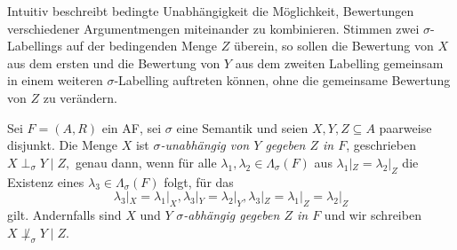 Intuitiv beschreibt bedingte Unabhängigkeit die Möglichkeit, 
Bewertungen verschiedener Argumentmengen miteinander zu kombinieren.
Stimmen zwei \(\sigma\)-Labellings auf der bedingenden Menge \(Z\) überein, 
so sollen die Bewertung von \(X\) aus dem ersten und die Bewertung von 
\(Y\) aus dem zweiten Labelling gemeinsam in einem weiteren 
\(\sigma\)-Labelling auftreten können, ohne die gemeinsame Bewertung von \(Z\) zu verändern.
\begin{Definition}
    \label{def:sigma-independence-af}
    Sei \(F =(A,R)\) ein AF, sei \(\sigma\) eine Semantik
    und seien \(X,Y,Z\subseteq A\) paarweise disjunkt. Die Menge \(X\) ist
    \emph{\(\sigma\)-unabhängig von \(Y\) gegeben \(Z\) in \(F\)},
    geschrieben
    \(
        X\perp_\sigma Y\mid Z,
    \)
    genau dann, wenn für alle
    \(\lambda_1,\lambda_2\in\Lambda_\sigma(F)\) aus
    \(\lambda_1|_Z=\lambda_2|_Z\) die Existenz eines
    \(\lambda_3\in\Lambda_\sigma(F)\) folgt, für das
    \[
        \lambda_3|_X=\lambda_1|_X,
        \lambda_3|_Y=\lambda_2|_Y,
        \lambda_3|_Z=\lambda_1|_Z=\lambda_2|_Z
    \]
    gilt. Andernfalls sind \(X\) und \(Y\) \emph{\(\sigma\)-abhängig
    gegeben \(Z\) in \(F\)} und wir schreiben
    \(X\not\perp_\sigma Y\mid Z\).
\end{Definition}

